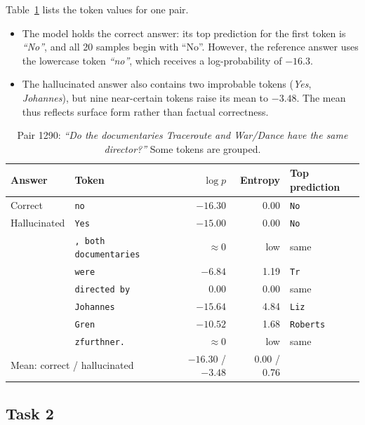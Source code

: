 \documentclass[11pt,a4paper]{article}
\begin{document}
Table~\ref{tab:tokens} lists the token values for one pair.

\begin{itemize}
  \item The model holds the correct answer: its top prediction for the first token is
        \emph{``No''}, and all 20 samples begin with ``No''. However, the reference answer uses
        the lowercase token \emph{``no''}, which receives a log-probability of $-16.3$.
  \item The hallucinated answer also contains two improbable tokens (\emph{Yes}, \emph{Johannes}),
        but nine near-certain tokens raise its mean to $-3.48$. The mean thus reflects surface form
        rather than factual correctness.
\end{itemize}

\begin{table}[t]
\centering\small
\begin{tabular}{llrrl}
\toprule
Answer & Token & $\log p$ & Entropy & Top prediction \\
\midrule
Correct          & \texttt{no}              & $-16.30$ & 0.00 & \texttt{No} \\
\midrule
Hallucinated     & \texttt{Yes}             & $-15.00$ & 0.00 & \texttt{No} \\
                 & \texttt{, both documentaries} & $\approx 0$ & low & same \\
                 & \texttt{were}            & $-6.84$  & 1.19 & \texttt{Tr} \\
                 & \texttt{directed by}     & $0.00$   & 0.00 & same \\
                 & \texttt{Johannes}        & $-15.64$ & 4.84 & \texttt{Liz} \\
                 & \texttt{Gren}            & $-10.52$ & 1.68 & \texttt{Roberts} \\
                 & \texttt{zfurthner.}      & $\approx 0$ & low & same \\
\midrule
\multicolumn{2}{l}{Mean: correct / hallucinated} & $-16.30$ / $-3.48$ & 0.00 / 0.76 & \\
\bottomrule
\end{tabular}
\caption{Pair 1290: \emph{``Do the documentaries Traceroute and War/Dance have the same
director?''} Some tokens are grouped.}
\label{tab:tokens}
\end{table}

\subsection{Task 2}
\end{document}

